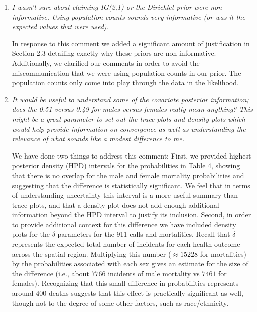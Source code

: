 \documentclass{article}
\begin{document}
\begin{enumerate}
\item\textit{I wasn't sure about claiming IG(2,1) or the Dirichlet prior were non-informative.   Using population counts sounds very informative (or was it the expected values that were used).}

In response to this comment we added a significant amount of justification in Section 2.3 detailing exactly why these priors are non-informative. Additionally, we clarified our comments in order to avoid the miscommunication that we were using population counts in our prior. The population counts only come into play through the data in the likelihood.

\item\textit{It would be useful to understand some of the covariate posterior information; does the 0.51 versus 0.49 for males versus females really mean anything? This might be a great parameter to set out the trace plots and density plots which would help provide information on convergence as well as understanding the relevance of what sounds like a modest difference to me.}

We have done two things to address this comment: First, we provided highest posterior density (HPD) intervals for the probabilities in Table 4, showing that there is no overlap for the male and female mortality probabilities and suggesting that the difference is statistically significant. We feel that in terms of understanding uncertainty this interval is a more useful summary than trace plots, and that a density plot does not add enough additional information beyond the HPD interval to justify its inclusion. Second, in order to provide additional context for this difference we have included density plots for the $\delta$ parameters for the 911 calls and mortalities. Recall that $\delta$ represents the expected total number of incidents for each health outcome across the spatial region. Multiplying this number ($\approx 15228$ for mortalities) by the probabilities associated with each sex gives an estimate for the size of the difference (i.e., about $7766$ incidents of male mortality vs $7461$ for females). Recognizing that this small difference in probabilities represents around 400 deaths suggests that this effect is practically significant as well, though not to the degree of some other factors, such as race/ethnicity. 



\end{enumerate}
\end{document}
